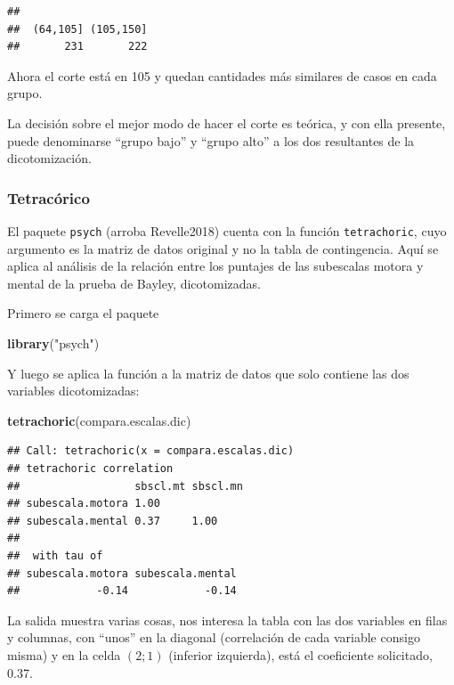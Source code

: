 \documentclass[]{book}
\newenvironment{Shaded}{\begin{snugshade}}{\end{snugshade}}
\newcommand{\KeywordTok}[1]{\textcolor[rgb]{0.13,0.29,0.53}{\textbf{#1}}}
\newcommand{\NormalTok}[1]{#1}
\newcommand{\StringTok}[1]{\textcolor[rgb]{0.31,0.60,0.02}{#1}}
\begin{document}
\begin{verbatim}
## 
##  (64,105] (105,150] 
##       231       222
\end{verbatim}

Ahora el corte está en 105 y quedan cantidades más similares de casos en cada grupo.

La decisión sobre el mejor modo de hacer el corte es teórica, y con ella presente, puede denominarse ``grupo bajo'' y ``grupo alto'' a los dos resultantes de la dicotomización.

\hypertarget{tetracorico}{%
\subsubsection{Tetracórico}\label{tetracorico}}

El paquete \texttt{psych} (arroba Revelle2018) cuenta con la función \texttt{tetrachoric}, cuyo argumento es la matriz de datos original y no la tabla de contingencia. Aquí se aplica al análisis de la relación entre los puntajes de las subescalas motora y mental de la prueba de Bayley, dicotomizadas.

Primero se carga el paquete

\begin{Shaded}
\begin{Highlighting}[]
\KeywordTok{library}\NormalTok{(}\StringTok{"psych"}\NormalTok{)}
\end{Highlighting}
\end{Shaded}

Y luego se aplica la función a la matriz de datos que solo contiene las dos variables dicotomizadas:

\begin{Shaded}
\begin{Highlighting}[]
\KeywordTok{tetrachoric}\NormalTok{(compara.escalas.dic)}
\end{Highlighting}
\end{Shaded}

\begin{verbatim}
## Call: tetrachoric(x = compara.escalas.dic)
## tetrachoric correlation 
##                  sbscl.mt sbscl.mn
## subescala.motora 1.00             
## subescala.mental 0.37     1.00    
## 
##  with tau of 
## subescala.motora subescala.mental 
##            -0.14            -0.14
\end{verbatim}

La salida muestra varias cosas, nos interesa la tabla con las dos variables en filas y columnas, con ``unos'' en la diagonal (correlación de cada variable consigo misma) y en la celda \((2; 1)\) (inferior izquierda), está el coeficiente solicitado, 0.37.
\end{document}
